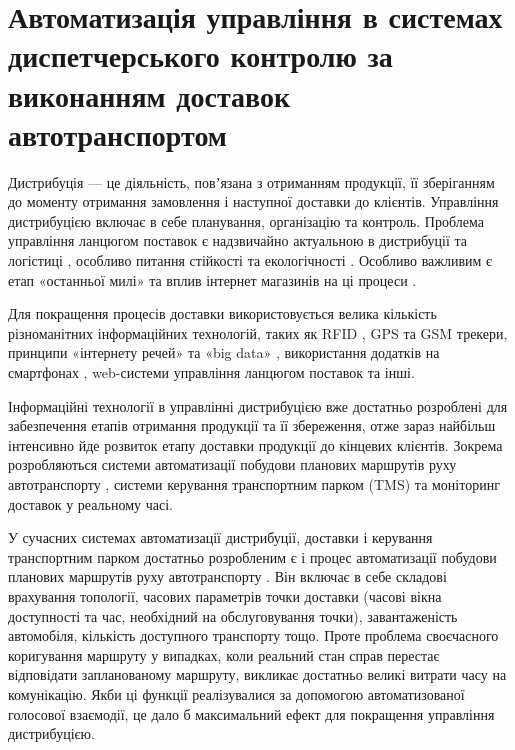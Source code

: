 \section{Автоматизація управління в системах диспетчерського контролю за виконанням доставок автотранспортом} \label{sect1_3}

Дистрибуція — це діяльність, повʼязана з отриманням продукції, її зберіганням до моменту отримання замовлення і наступної доставки до клієнтів. Управління дистрибуцією включає в себе планування, організацію та контроль. Проблема управління ланцюгом поставок є надзвичайно актуальною в дистрибуції та логістиці \cite{Speranza_2018}, особливо питання стійкості \cite{Koberg_2018,Jia_2018,Bastas_2019,Wen_2018,Sullet_2018} та екологічності \cite{Tseng_2019,Papetti_2019,Hoehne_2017}. Особливо важливим є етап «останньої милі» \cite{Baldi_2018,Gdowska_2018,Boysen_2018,Hoehne_2017,Pronello_2017,Cook_2017} та вплив інтернет магазинів на ці процеси \cite{Allen_2018,Cardenas_2017}.

Для покращення процесів доставки використовується велика кількість різноманітних інформаційних технологій, таких як RFID \cite{Prasanna_2012}, GPS \cite{Stopher_2018,Prasanna_2012} та GSM \cite{Prasanna_2012} трекери, принципи «інтернету речей» \cite{Liu_2018} та «big data» \cite{Govindan_2018}, використання додатків на смартфонах \cite{Stopher_2018}, web-системи управління ланцюгом поставок \cite{Papetti_2019} та інші.

Інформаційні технології в управлінні дистрибуцією вже достатньо розроблені для забезпечення етапів отримання продукції та її збереження, отже зараз найбільш інтенсивно йде розвиток етапу доставки продукції до кінцевих клієнтів. Зокрема розробляються системи автоматизації побудови планових маршрутів руху автотранспорту \cite{art1}, системи керування транспортним парком (TMS) та моніторинг доставок у реальному часі.

У сучасних системах автоматизації дистрибуції, доставки і керування транспортним парком достатньо розробленим є і процес автоматизації побудови планових маршрутів руху автотранспорту \cite{art1}. Він включає в себе складові врахування топології, часових параметрів точки доставки (часові вікна доступності та час, необхідний на обслуговування точки), завантаженість автомобіля, кількість доступного транспорту тощо. Проте проблема своєчасного коригування маршруту у випадках, коли реальний стан справ перестає відповідати запланованому маршруту, викликає достатньо великі витрати часу на комунікацію. Якби ці функції реалізувалися за допомогою автоматизованої голосової взаємодії, це дало б максимальний ефект для покращення управління дистрибуцією.

